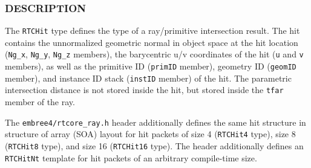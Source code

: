 \begin{Shaded}
\begin{Highlighting}[]

\OperatorTok{\{}
  \OperatorTok{;}                                        
  \OperatorTok{;}                                        
  \OperatorTok{;}                                        

  \OperatorTok{;}                                           
  \OperatorTok{;}                                           

   \OperatorTok{;}                               
   \OperatorTok{;}                               
   \OperatorTok{[}\OperatorTok{];} 
\OperatorTok{\};}
\end{Highlighting}
\end{Shaded}

\subsubsection{DESCRIPTION}\label{description}

The \texttt{RTCHit} type defines the type of a ray/primitive
intersection result. The hit contains the unnormalized geometric normal
in object space at the hit location (\texttt{Ng\_x}, \texttt{Ng\_y},
\texttt{Ng\_z} members), the barycentric u/v coordinates of the hit
(\texttt{u} and \texttt{v} members), as well as the primitive ID
(\texttt{primID} member), geometry ID (\texttt{geomID} member), and
instance ID stack (\texttt{instID} member) of the hit. The parametric
intersection distance is not stored inside the hit, but stored inside
the \texttt{tfar} member of the ray.

The \texttt{embree4/rtcore\_ray.h} header additionally defines the same
hit structure in structure of array (SOA) layout for hit packets of size
4 (\texttt{RTCHit4} type), size 8 (\texttt{RTCHit8} type), and size 16
(\texttt{RTCHit16} type). The header additionally defines an
\texttt{RTCHitNt} template for hit packets of an arbitrary compile-time
size.

